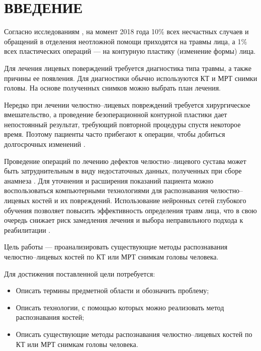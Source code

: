\section*{ВВЕДЕНИЕ}

Согласно исследованиям \cite{facialfracs0}\cite{isaps}, на момент 2018 года 10\% всех несчастных случаев и обращений в отделения неотложной помощи приходятся на травмы лица, а 1\% всех пластических операций --- на контурную пластику (изменение формы) лица.

Для лечения лицевых поверждений требуется диагностика типа травмы, а также причины ее появления. Для диагностики обычно используются КТ и МРТ снимки головы. На основе полученных снимков можно выбрать план лечения.

Нередко при лечении челюстно--лицевых повреждений требуется хирургическое вмешательство, а проведение безоперационной контурной пластики дает непостоянный результат, требующий повторной процедуры спустя некоторое время. Поэтому пациенты часто прибегают к операции, чтобы добиться долгосрочных изменений \cite{isaps}.

Проведение операций по лечению дефектов челюстно--лицевого сустава может быть затруднительным в виду недостаточных данных, полученных при сборе анамнеза \cite{facialfracs1}. Для уточнения и расширения показаний пациента можно воспользоваться компьютерными технологиями для распознавания челюстно--лицевых костей и их повреждений. Использование нейронных сетей глубокого обучения позволяет повысить эффективность определения травм лица, что в свою очередь снижает риск замедления лечения и выбора неправильного подхода к реабилитации \cite{facialfracs2}.

Цель работы --- проанализировать существующие методы распознавания челюстно--лицевых костей по КТ или МРТ снимкам головы человека.

Для достижения поставленной цели потребуется:
\begin{itemize}
\item Описать термины предметной области и обозначить проблему;
\item Описать технологии, с помощью которых можно реализовать метод распознавания костей;
\item Описать существующие методы распознавания челюстно--лицевых костей по КТ или МРТ снимкам головы человека.
\end{itemize}